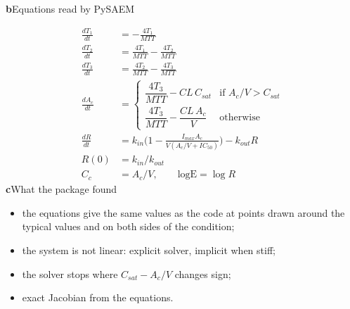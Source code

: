 \documentclass[border=4pt]{standalone}
\begin{document}
\begin{minipage}[t]{7cm}
\vspace{0pt}
{\small\textbf{b}\quad Equations read by PySAEM}\par
\small
\begin{align*}
\frac{dT_1}{dt} &= -\frac{4T_1}{MTT}\\
\frac{dT_2}{dt} &= \frac{4T_1}{MTT} - \frac{4T_2}{MTT}\\
\frac{dT_3}{dt} &= \frac{4T_2}{MTT} - \frac{4T_3}{MTT}\\
\frac{dA_c}{dt} &= \begin{cases} \dfrac{4T_3}{MTT} - CL\,C_{sat} & \text{if } A_c/V > C_{sat}\\[6pt]
\dfrac{4T_3}{MTT} - \dfrac{CL\,A_c}{V} & \text{otherwise}\end{cases}\\
\frac{dR}{dt} &= k_{in}\Big(1 - \frac{I_{max}A_c}{V(A_c/V + IC_{50})}\Big) - k_{out}R\\
R(0) &= k_{in}/k_{out}\\
C_c &= A_c/V, \qquad \mathrm{logE} = \log R
\end{align*}
\normalsize
{\small\textbf{c}\quad What the package found}\par\smallskip
\begin{minipage}{6.4cm}\small
\begin{itemize}\setlength{\itemsep}{1pt}\setlength{\leftmargin}{1em}
\item the equations give the same values as the code at points drawn around the typical values and on both sides of the condition;
\item the system is not linear: explicit solver, implicit when stiff;
\item the solver stops where $C_{sat} - A_c/V$ changes sign;
\item exact Jacobian from the equations.
\end{itemize}
\end{minipage}
\end{minipage}
\end{document}
